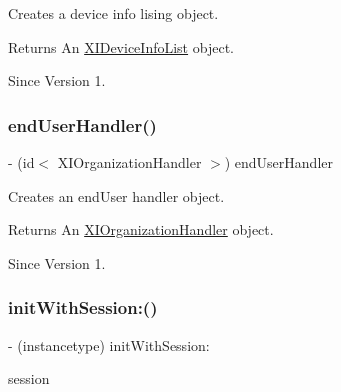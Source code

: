 Creates a device info lising object. 

\begin{DoxyReturn}{Returns}
An \hyperlink{class_x_i_device_info_list-p}{X\+I\+Device\+Info\+List} object. 
\end{DoxyReturn}
\begin{DoxySince}{Since}
Version 1. 
\end{DoxySince}
\hypertarget{interface_x_i_session_services_internal_af6e364386121abc42ca21dcada112fd5}{}\label{interface_x_i_session_services_internal_af6e364386121abc42ca21dcada112fd5} 
\subsubsection{\texorpdfstring{end\+User\+Handler()}{endUserHandler()}}
{\footnotesize\ttfamily -\/ (id$<$ X\+I\+Organization\+Handler $>$) end\+User\+Handler \begin{DoxyParamCaption}{ }\end{DoxyParamCaption}}



Creates an end\+User handler object. 

\begin{DoxyReturn}{Returns}
An \hyperlink{class_x_i_organization_handler-p}{X\+I\+Organization\+Handler} object. 
\end{DoxyReturn}
\begin{DoxySince}{Since}
Version 1. 
\end{DoxySince}
\hypertarget{interface_x_i_session_services_internal_a8496751bb3437da322555a3fb702f246}{}\label{interface_x_i_session_services_internal_a8496751bb3437da322555a3fb702f246} 
\subsubsection{\texorpdfstring{init\+With\+Session\+:()}{initWithSession:()}}
{\footnotesize\ttfamily -\/ (instancetype) init\+With\+Session\+: \begin{DoxyParamCaption}\item[{(\hyperlink{interface_x_i_session_internal}{X\+I\+Session\+Internal} $\ast$)}]{session }\end{DoxyParamCaption}}



